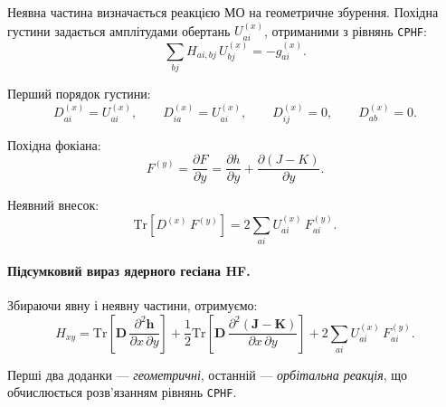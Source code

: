 \documentclass{PySCFBook}
\begin{document}
Неявна частина визначається реакцією МО на геометричне збурення.
Похідна густини задається амплітудами обертань $U_{ai}^{(x)}$, отриманими
з рівнянь \texttt{CPHF}:
\begin{equation}\label{eq:HF_Hessian_CPHF}
\sum_{bj}
H_{ai,bj}\,U^{(x)}_{bj}
=
-g^{(x)}_{ai}.
\end{equation}

Перший порядок густини:
\begin{equation}
D^{(x)}_{ai}=U^{(x)}_{ai},\qquad
D^{(x)}_{ia}=U^{(x)}_{ai},\qquad
D^{(x)}_{ij}=0,\qquad
D^{(x)}_{ab}=0.
\end{equation}

Похідна фокіана:
\begin{equation}
F^{(y)}=\frac{\partial F}{\partial y}
=
\frac{\partial h}{\partial y}
+
\frac{\partial (J-K)}{\partial y}.
\end{equation}

Неявний внесок:
\begin{equation}\label{eq:HF_Hessian_implicit}
\mathrm{Tr}\!\left[
D^{(x)}\,F^{(y)}
\right]
=
2\sum_{ai}
U^{(x)}_{ai}\,
F^{(y)}_{ai}.
\end{equation}

\paragraph{Підсумковий вираз ядерного гесіана HF.}

Збираючи явну і неявну частини, отримуємо:
\begin{equation}\label{eq:HF_Hessian_final}
H_{xy}
=
\mathrm{Tr}\!\left[
\mathbf D\,\frac{\partial^2 \mathbf h}{\partial x\,\partial y}
\right]
+
\frac12
\mathrm{Tr}\!\left[
\mathbf D\,\frac{\partial^2 (\mathbf J-\mathbf K)}{\partial x\,\partial y}
\right]
+
2\sum_{ai}
U^{(x)}_{ai}\,
F^{(y)}_{ai}.
\end{equation}

Перші два доданки — \emph{геометричні}, останній — \emph{орбітальна реакція},
що обчислюється розв’язанням рівнянь \texttt{CPHF}.
\end{document}
